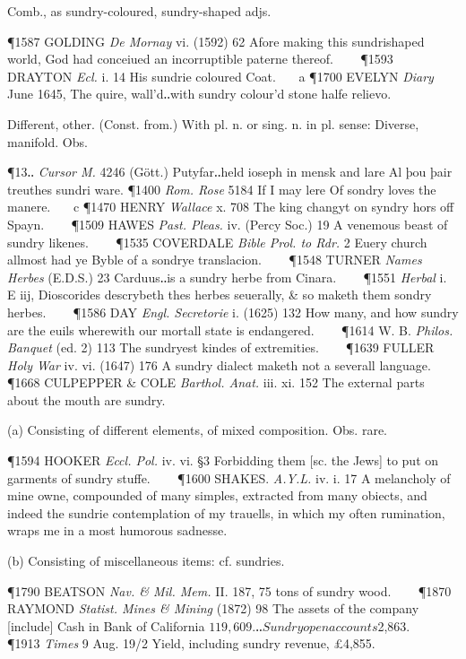 \begin{description}[wide, labelwidth=!, labelindent=0pt]
\begin{myenumerate}
 Comb., as sundry-coloured, sundry-shaped adjs.

\P 1587 GOLDING  \textit{De Mornay} vi. (1592) 62 Afore making this sundrishaped world, God had conceiued an incorruptible paterne thereof.    
\P 1593 DRAYTON  \textit{Ecl.} i. 14 His sundrie coloured Coat.    a 
\P 1700 EVELYN  \textit{Diary} June 1645, The quire, wall'd‥with sundry colour'd stone halfe relievo.

 Different, other. (Const. from.) With pl. n. or sing. n. in pl. sense: Diverse, manifold. Obs.

\P 13‥ \textit{Cursor M.} 4246 (Gött.) Putyfar‥held ioseph in mensk and lare Al þou þair treuthes sundri ware. 
\P 1400  \textit{Rom. Rose} 5184 If I may lere Of sondry loves the manere.    c 
\P 1470 HENRY  \textit{Wallace} x. 708 The king changyt on syndry hors off Spayn.    
\P 1509 HAWES  \textit{Past. Pleas.} iv. (Percy Soc.) 19 A venemous beast of sundry likenes.    
\P 1535 COVERDALE  \textit{Bible Prol. to Rdr.} 2 Euery church allmost had ye Byble of a sondrye translacion.     
\P 1548 TURNER  \textit{Names Herbes} (E.D.S.) 23 Carduus‥is a sundry herbe from Cinara.     
\P 1551 \textit{Herbal} i. E iij, Dioscorides descrybeth thes herbes seuerally, \& so maketh them sondry herbes.     
\P 1586 DAY  \textit{Engl. Secretorie} i. (1625) 132 How many, and how sundry are the euils wherewith our mortall state is endangered.     
\P 1614 W. B. \textit{Philos.  Banquet} (ed. 2) 113 The sundryest kindes of extremities.     
\P 1639 FULLER  \textit{Holy War} iv. vi. (1647) 176 A sundry dialect maketh not a severall language.     
\P 1668 CULPEPPER \& COLE  \textit{Barthol. Anat.} iii. xi. 152 The external parts about the mouth are sundry.

 (a) Consisting of different elements, of mixed composition. Obs. rare.

\P 1594 HOOKER  \textit{Eccl. Pol.} iv. vi. §3 Forbidding them [sc. the Jews] to put on garments of sundry stuffe.    
\P 1600 SHAKES.  \textit{A.Y.L.} iv. i. 17 A melancholy of mine owne, compounded of many simples, extracted from many obiects, and indeed the sundrie contemplation of my trauells, in which my often rumination, wraps me in a most humorous sadnesse.

(b) Consisting of miscellaneous items: cf. sundries.

\P 1790 BEATSON  \textit{Nav. \& Mil. Mem.} II. 187, 75 tons of sundry wood.    
\P 1870 RAYMOND  \textit{Statist. Mines \& Mining} (1872) 98 The assets of the company [include] Cash in Bank of California $119,609.‥ Sundry open accounts $2,863.    
\P 1913  \textit{Times} 9 Aug. 19/2 Yield, including sundry revenue, £4,855.


\end{myenumerate}
\end{description}
